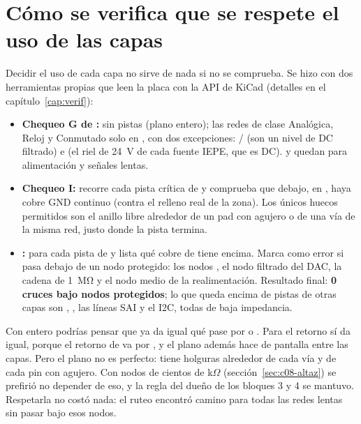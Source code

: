 \section{Cómo se verifica que se respete el uso de las capas}\label{sec:c08-politica}

Decidir el uso de cada capa no sirve de nada si no se comprueba. Se hizo con dos herramientas propias que leen la
placa con la API de KiCad (detalles en el capítulo~\ref{cap:verif}):

\begin{itemize}
  \item \textbf{Chequeo G de :}  sin pistas (plano entero); las redes de clase
  Analógica, Reloj y Conmutado solo en , con dos excepciones: / (son un nivel de
  DC filtrado) e  (el riel de \SI{24}{\volt} de cada fuente IEPE, que es DC).  y
   quedan para alimentación y señales lentas.
  \item \textbf{Chequeo I:} recorre cada pista crítica de  y comprueba que debajo, en , haya
  cobre GND continuo (contra el relleno real de la zona). Los únicos huecos permitidos son el anillo libre alrededor de
  un pad con agujero o de una vía de la misma red, justo donde la pista termina.
  \item \textbf{:} para cada pista de  y  lista qué cobre de
   tiene encima. Marca como error si pasa debajo de un nodo protegido: los nodos , el nodo filtrado
  del DAC, la cadena de \SI{1}{\mega\ohm} y el nodo medio de la realimentación. Resultado final: \textbf{0 cruces bajo
  nodos protegidos}; lo que queda encima de pistas de otras capas son , , las líneas SAI y el
  I2C, todas de baja impedancia.
\end{itemize}

\begin{ojo}
Con  entero podrías pensar que ya da igual qué pase por  o . Para el retorno sí da
igual, porque el retorno de  va por , y el plano además hace de pantalla entre las capas. Pero
el plano no es perfecto: tiene holguras alrededor de cada vía y de cada pin con agujero. Con nodos de cientos de
k$\Omega$ (sección~\ref{sec:c08-altaz}) se prefirió no depender de eso, y la regla del dueño de los bloques 3 y 4 se
mantuvo. Respetarla no costó nada: el ruteo encontró camino para todas las redes lentas sin pasar bajo esos nodos.
\end{ojo}

